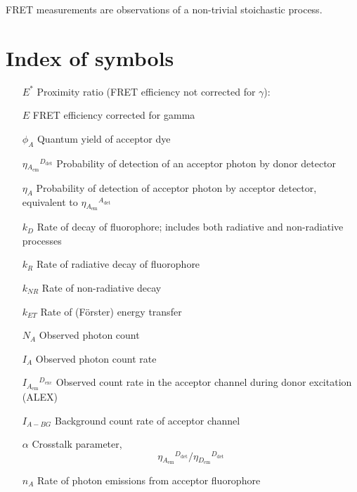 \documentclass{article}
\newcommand{\emm}[1]{\ensuremath{_{#1_\mathrm{em}}}}   %
\newcommand{\exc}[1]{\ensuremath{^{#1_\mathrm{exc}}}}  %
\newcommand{\dt}[1]{\ensuremath{^{#1_\mathrm{det}}}}   %
\newcommand{\I}[2]{\ensuremath{I\emm{#1}\exc{#2}}}
\begin{document}
FRET measurements are observations of a non-trivial stoichastic process.

\section{Index of symbols}

\begin{enumerate}
\item[$E^*$] Proximity ratio (FRET efficiency not corrected for $\gamma$):
\item[$E$] FRET efficiency corrected for gamma
\item[$\phi_{A}$] Quantum yield of acceptor dye
\item[$\eta\emm{A}\dt{D}$] Probability of detection of an acceptor photon by donor detector
\item[$\eta_A$] Probability of detection of acceptor photon by acceptor detector, equivalent to $\eta\emm{A}\dt{A}$
\item[$k_D$] Rate of decay of fluorophore; includes both radiative and non-radiative processes
\item[$k_R$] Rate of radiative decay of fluorophore
\item[$k_{NR}$] Rate of non-radiative decay
\item[$k_{ET}$] Rate of (F\"orster) energy transfer
\item[$N_A$] Observed photon count
\item[$I_A$] Observed photon count rate
\item[$\I{A}{D}$] Observed count rate in the acceptor channel during donor excitation (ALEX)
\item[$I_{A-BG}$] Background count rate of acceptor channel
\item[$\alpha$] Crosstalk parameter, \[ \eta\emm{A}\dt{D} / \eta\emm{D}\dt{D} \]
\item[$n_A$] Rate of photon emissions from acceptor fluorophore
\end{enumerate}
\end{document}
